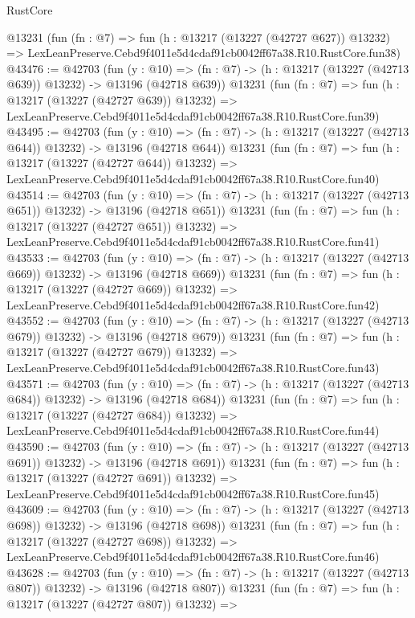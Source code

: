 \begin{lexlean}{RustCore}
\begin{coremodule}
    @13231
    (fun (fn : @7) =>
    fun (h : @13217 (@13227 (@42727 @627)) @13232) =>
    LexLeanPreserve.Cebd9f4011e5d4cdaf91cb0042ff67a38.R10.RustCore.fun38)
@43476 := @42703
    (fun (y : @10) =>
    (fn : @7) -> (h : @13217 (@13227 (@42713 @639)) @13232) -> @13196 (@42718 @639))
    @13231
    (fun (fn : @7) =>
    fun (h : @13217 (@13227 (@42727 @639)) @13232) =>
    LexLeanPreserve.Cebd9f4011e5d4cdaf91cb0042ff67a38.R10.RustCore.fun39)
@43495 := @42703
    (fun (y : @10) =>
    (fn : @7) -> (h : @13217 (@13227 (@42713 @644)) @13232) -> @13196 (@42718 @644))
    @13231
    (fun (fn : @7) =>
    fun (h : @13217 (@13227 (@42727 @644)) @13232) =>
    LexLeanPreserve.Cebd9f4011e5d4cdaf91cb0042ff67a38.R10.RustCore.fun40)
@43514 := @42703
    (fun (y : @10) =>
    (fn : @7) -> (h : @13217 (@13227 (@42713 @651)) @13232) -> @13196 (@42718 @651))
    @13231
    (fun (fn : @7) =>
    fun (h : @13217 (@13227 (@42727 @651)) @13232) =>
    LexLeanPreserve.Cebd9f4011e5d4cdaf91cb0042ff67a38.R10.RustCore.fun41)
@43533 := @42703
    (fun (y : @10) =>
    (fn : @7) -> (h : @13217 (@13227 (@42713 @669)) @13232) -> @13196 (@42718 @669))
    @13231
    (fun (fn : @7) =>
    fun (h : @13217 (@13227 (@42727 @669)) @13232) =>
    LexLeanPreserve.Cebd9f4011e5d4cdaf91cb0042ff67a38.R10.RustCore.fun42)
@43552 := @42703
    (fun (y : @10) =>
    (fn : @7) -> (h : @13217 (@13227 (@42713 @679)) @13232) -> @13196 (@42718 @679))
    @13231
    (fun (fn : @7) =>
    fun (h : @13217 (@13227 (@42727 @679)) @13232) =>
    LexLeanPreserve.Cebd9f4011e5d4cdaf91cb0042ff67a38.R10.RustCore.fun43)
@43571 := @42703
    (fun (y : @10) =>
    (fn : @7) -> (h : @13217 (@13227 (@42713 @684)) @13232) -> @13196 (@42718 @684))
    @13231
    (fun (fn : @7) =>
    fun (h : @13217 (@13227 (@42727 @684)) @13232) =>
    LexLeanPreserve.Cebd9f4011e5d4cdaf91cb0042ff67a38.R10.RustCore.fun44)
@43590 := @42703
    (fun (y : @10) =>
    (fn : @7) -> (h : @13217 (@13227 (@42713 @691)) @13232) -> @13196 (@42718 @691))
    @13231
    (fun (fn : @7) =>
    fun (h : @13217 (@13227 (@42727 @691)) @13232) =>
    LexLeanPreserve.Cebd9f4011e5d4cdaf91cb0042ff67a38.R10.RustCore.fun45)
@43609 := @42703
    (fun (y : @10) =>
    (fn : @7) -> (h : @13217 (@13227 (@42713 @698)) @13232) -> @13196 (@42718 @698))
    @13231
    (fun (fn : @7) =>
    fun (h : @13217 (@13227 (@42727 @698)) @13232) =>
    LexLeanPreserve.Cebd9f4011e5d4cdaf91cb0042ff67a38.R10.RustCore.fun46)
@43628 := @42703
    (fun (y : @10) =>
    (fn : @7) -> (h : @13217 (@13227 (@42713 @807)) @13232) -> @13196 (@42718 @807))
    @13231
    (fun (fn : @7) =>
    fun (h : @13217 (@13227 (@42727 @807)) @13232) =>

\end{coremodule}
\end{lexlean}
